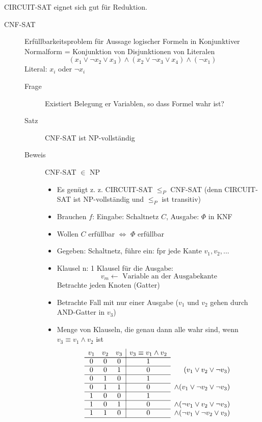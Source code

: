 CIRCUIT-SAT eignet sich gut für Reduktion.
\begin{description}
 \item[CNF-SAT] Erfüllbarkeitsproblem für Aussage logischer Formeln in Konjunktiver Normalform = Konjunktion von Disjunktionen von Literalen
 \[(x_1 \lor \neg x_2 \lor x_3) \land (x_2 \lor \neg x_3 \lor x_4) \land (\neg x_1)\]
 Literal: $x_i$ oder $\neg x_i$
 \begin{description}
  \item[Frage] Existiert Belegung er Variablen, so dass Formel wahr ist?
  \item[Satz] CNF-SAT ist NP-vollständig
  \item[Beweis] CNF-SAT $\in$ NP
  \begin{itemize}
   \item Es genügt z. z. CIRCUIT-SAT $\leq_P$ CNF-SAT (denn CIRCUIT-SAT ist NP-vollständig und $\leq_P$ ist transitiv)
   \item Brauchen $f$: Eingabe: Schaltnetz $C$, Ausgabe: $\Phi$ in KNF
   \item Wollen $C$ erfüllbar $\Leftrightarrow$ $\Phi$ erfüllbar
   \item Gegeben: Schaltnetz, führe ein: fpr jede Kante $v_1, v_2, ...$
   \item Klausel n: 1 Klausel für die Ausgabe:
           \[v_m \leftarrow\text{ Variable an der Ausgabekante}\]
       Betrachte jeden Knoten (Gatter)
   \item Betrachte Fall mit nur einer Ausgabe ($v_1$ und $v_2$ gehen durch AND-Gatter in $v_3$)
   \item Menge von Klauseln, die genau dann alle wahr sind, wenn $v_3 \equiv v_1 \land v_2$ ist
       \[
        \begin{array}{ccc|cr}
            v_1 & v_2 & v_3 & v_3 \equiv v_1 \land v_2 \\\cline{1-4}\cline{1-4}
            0   & 0   & 0   & 1\\\cline{1-4}
            0   & 0   & 1   & 0 & (v_1 \lor v_2 \lor \neg v_3) \\\cline{1-4}
            0   & 1   & 0   & 1 \\\cline{1-4}
            0   & 1   & 1   & 0 & \land (v_1 \lor \neg v_2 \lor \neg v_3) \\\cline{1-4} 
            1   & 0   & 0   & 1 \\\cline{1-4}
            1   & 0   & 1   & 0 & \land (\neg v_1 \lor v_2 \lor \neg v_3) \\\cline{1-4} 
            1   & 1   & 0   & 0 & \land (\neg v_1 \lor \neg v_2 \lor v_3) \\\cline{1-4} 

\end{array}\]
\end{itemize}
\end{description}
\end{description}

